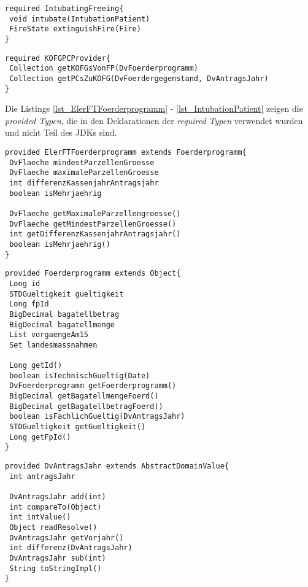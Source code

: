 \begin{lstlisting}[style = dsl, caption = Deklaration von IntubatingPatientFireFighter, captionpos = b, label = lst_tei6]
required IntubatingFreeing{
 void intubate(IntubationPatient)
 FireState extinguishFire(Fire)
}
\end{lstlisting}
\begin{lstlisting}[style = dsl, caption = Deklaration von KOFGPCProvider, captionpos = b, label = lst_tei7]
required KOFGPCProvider{
 Collection getKOFGsVonFP(DvFoerderprogramm)
 Collection getPCsZuKOFG(DvFoerdergegenstand, DvAntragsJahr)
}
\end{lstlisting}
\newpage
\noindent
Die Listings \ref{lst_ElerFTFoerderprogramm} - \ref{lst_IntubationPatient} zeigen die \emph{provided Typen}, die in den Deklarationen der \emph{required Typen} verwendet wurden und nicht Teil des JDKs sind.
\begin{lstlisting}[style = dsl, caption = Deklaration von ElerFTFoerderprogramm, captionpos = b, label = lst_ElerFTFoerderprogramm]
provided ElerFTFoerderprogramm extends Foerderprogramm{
 DvFlaeche mindestParzellenGroesse
 DvFlaeche maximaleParzellenGroesse
 int differenzKassenjahrAntragsjahr
 boolean isMehrjaehrig
  
 DvFlaeche getMaximaleParzellengroesse()
 DvFlaeche getMindestParzellenGroesse()
 int getDifferenzKassenjahrAntragsjahr()
 boolean isMehrjaehrig()
}
\end{lstlisting}
\begin{lstlisting}[style = dsl, caption = Deklaration von Foerderprogramm, captionpos = b, label = lst_Foerderprogramm]
provided Foerderprogramm extends Object{
 Long id
 STDGueltigkeit gueltigkeit
 Long fpId
 BigDecimal bagatellbetrag
 BigDecimal bagatellmenge
 List vorgaengeAm15
 Set landesmassnahmen
  
 Long getId()
 boolean isTechnischGueltig(Date)
 DvFoerderprogramm getFoerderprogramm()
 BigDecimal getBagatellmengeFoerd()
 BigDecimal getBagatellbetragFoerd()
 boolean isFachlichGueltig(DvAntragsJahr)
 STDGueltigkeit getGueltigkeit()
 Long getFpId()
}
\end{lstlisting}
\pagebreak
\begin{lstlisting}[style = dsl, caption = Deklaration von DvAntragsJahr, captionpos = b, label = lst_dvantragsjahr]
provided DvAntragsJahr extends AbstractDomainValue{
 int antragsJahr
  
 DvAntragsJahr add(int)
 int compareTo(Object)
 int intValue()
 Object readResolve()
 DvAntragsJahr getVorjahr()
 int differenz(DvAntragsJahr)
 DvAntragsJahr sub(int)
 String toStringImpl()
}
\end{lstlisting}
